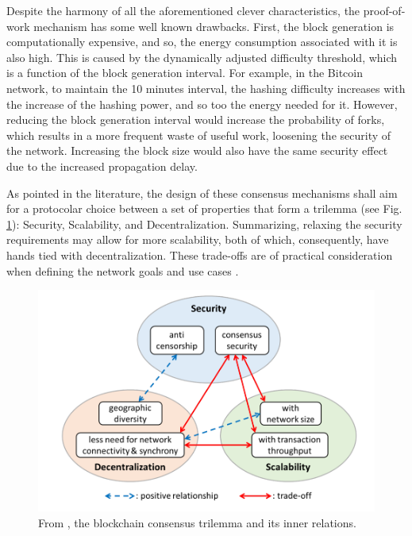 \documentclass[journal]{IEEEtran}
\begin{document}
Despite the harmony of all the aforementioned clever characteristics,
the proof-of-work mechanism has some well known drawbacks. 
First, the block generation is computationally expensive, and so, the
energy consumption associated with it is also high. This is caused by the
dynamically adjusted difficulty threshold, which is a function of the block 
generation interval. For example, in the Bitcoin network, to maintain the 10 
minutes interval, the hashing difficulty
increases with the increase of the hashing power, and so too the energy needed for it. 
However, reducing the block generation interval would increase the
probability of forks, which results in a more frequent waste of useful work,
loosening the security of the network. Increasing the block size would also
have the same security effect due to the increased propagation delay.

As pointed in the literature, the design of these consensus mechanisms
shall aim for a protocolar choice between a set of properties that form a trilemma (see Fig. \ref{fig:trilemma}): 
Security, Scalability, and Decentralization.
Summarizing, relaxing the security requirements may allow for more scalability, both of which,
consequently, have hands tied with decentralization. These trade-offs are of practical
consideration when defining the network goals and use cases \cite{survey-dist-consensus}.

\begin{figure}[h]
  \centering
  \includegraphics[width=\columnwidth]{trilemma}
  \caption{From \cite{survey-dist-consensus}, the blockchain consensus trilemma and its inner relations.}
  \label{fig:trilemma}
\end{figure}
\end{document}
